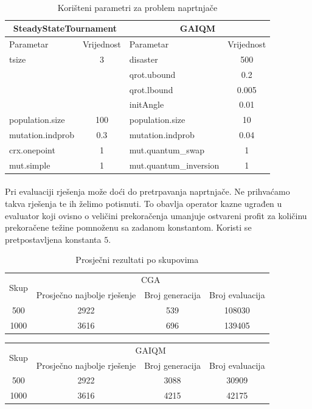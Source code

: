 \documentclass[times, utf8, zavrsni, numeric]{fer}
\begin{document}
\paragraph{}
\begin{table}[htb]
\caption{Korišteni parametri za problem naprtnjače}
\centering
\begin{tabular}{|l|c||l|c|} \hline
\multicolumn{2}{|c||}{SteadyStateTournament} & \multicolumn{2}{c|}{GAIQM} \\ 
\hline
Parametar & Vrijednost & Parametar & Vrijednost \\ 
\hline
tsize & 3 & disaster & 500 \\
&& qrot.ubound & 0.2 \\
&& qrot.lbound & 0.005 \\
&& initAngle & 0.01 \\
population.size & 100 & population.size & 10 \\
mutation.indprob & 0.3 & mutation.indprob & 0.04 \\
crx.onepoint & 1 & mut.quantum\_swap & 1 \\
mut.simple & 1 & mut.quantum\_inversion & 1 \\
\hline
\end{tabular}
\end{table}

\newpage

\paragraph{}
Pri evaluaciji rješenja može doći do pretrpavanja naprtnjače. Ne prihvaćamo takva rješenja te ih želimo potisnuti. To obavlja operator kazne ugrađen u evaluator koji ovisno o veličini prekoračenja umanjuje ostvareni profit za količinu prekoračene težine pomnoženu sa zadanom konstantom. Koristi se pretpostavljena konstanta $5$.

\newpage

\begin{table}[htb]
\caption{Prosječni rezultati po skupovima}
\centering
\begin{tabular}{|c|ccc|} \hline
\multirow{2}{*}{Skup} & \multicolumn{3}{c|}{CGA} \\ \cline{2-4}
 & Prosječno najbolje rješenje & Broj generacija & Broj evaluacija \\ 
\hline
500 & 2922 & 539 & 108030 \\
1000 & 3616 & 696 & 139405 \\
\hline
\end{tabular}
\end{table}
\begin{table}[htb]
\centering
\begin{tabular}{|c|ccc|} \hline
\multirow{2}{*}{Skup} & \multicolumn{3}{c|}{GAIQM} \\ \cline{2-4}
 & Prosječno najbolje rješenje & Broj generacija & Broj evaluacija \\ 
\hline
500 & 2922 & 3088 & 30909 \\
1000 & 3616 & 4215 & 42175 \\
\hline
\end{tabular}
\end{table}
\end{document}
